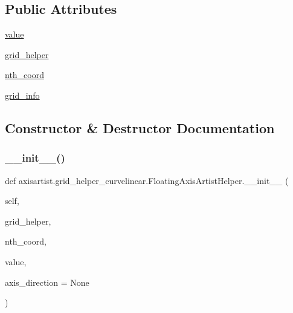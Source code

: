 \subsection*{Public Attributes}
\begin{DoxyCompactItemize}
\item 
\hyperlink{classaxisartist_1_1grid__helper__curvelinear_1_1FloatingAxisArtistHelper_acd3723c5d6ac4b0f39b0d19d4dcaeb2e}{value}
\item 
\hyperlink{classaxisartist_1_1grid__helper__curvelinear_1_1FloatingAxisArtistHelper_ae3c2d117daee0e3e929b8494e7714545}{grid\+\_\+helper}
\item 
\hyperlink{classaxisartist_1_1grid__helper__curvelinear_1_1FloatingAxisArtistHelper_ade8f0d379f93dc76a461c719c21752f8}{nth\+\_\+coord}
\item 
\hyperlink{classaxisartist_1_1grid__helper__curvelinear_1_1FloatingAxisArtistHelper_a355363dd1c7bfed4afc07287760a455e}{grid\+\_\+info}
\end{DoxyCompactItemize}


\subsection{Constructor \& Destructor Documentation}
\mbox{\label{classaxisartist_1_1grid__helper__curvelinear_1_1FloatingAxisArtistHelper_aea4c2844ea83c41a4c2167f59ecf7788}} 
\subsubsection{\texorpdfstring{\+\_\+\+\_\+init\+\_\+\+\_\+()}{\_\_init\_\_()}}
{\footnotesize\ttfamily def axisartist.\+grid\+\_\+helper\+\_\+curvelinear.\+Floating\+Axis\+Artist\+Helper.\+\_\+\+\_\+init\+\_\+\+\_\+ (\begin{DoxyParamCaption}\item[{}]{self,  }\item[{}]{grid\+\_\+helper,  }\item[{}]{nth\+\_\+coord,  }\item[{}]{value,  }\item[{}]{axis\+\_\+direction = {\ttfamily None} }\end{DoxyParamCaption})}

